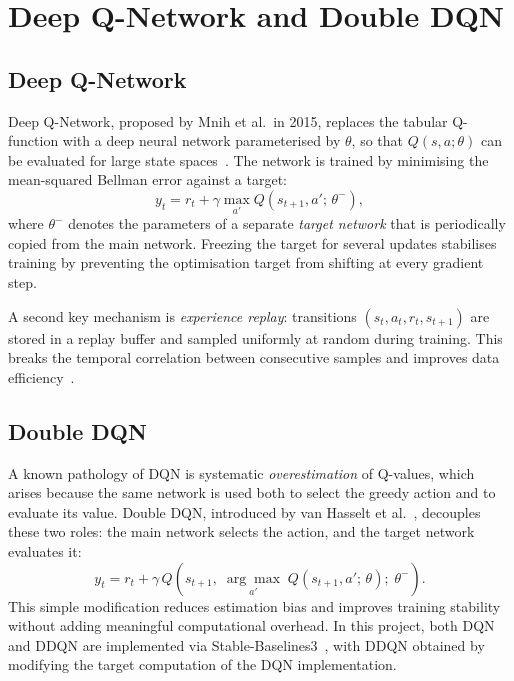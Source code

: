 \section{Deep Q-Network and Double DQN}

\subsection{Deep Q-Network}

Deep Q-Network, proposed by Mnih et al.\ in 2015, replaces the tabular
Q-function with a deep neural network parameterised by $\theta$, so that
$Q(s,a;\theta)$ can be evaluated for large state spaces~\cite{mnih2015humanlevel}.
The network is trained by minimising the mean-squared Bellman error against a
target:
\[
  y_t = r_t + \gamma\max_{a'} Q(s_{t+1}, a';\, \theta^{-}),
\]
where $\theta^{-}$ denotes the parameters of a separate \textit{target network}
that is periodically copied from the main network. Freezing the target for several
updates stabilises training by preventing the optimisation target from shifting at
every gradient step.

A second key mechanism is \textit{experience replay}: transitions
$(s_t, a_t, r_t, s_{t+1})$ are stored in a replay buffer and sampled uniformly at
random during training. This breaks the temporal correlation between consecutive
samples and improves data efficiency~\cite{mnih2015humanlevel}.

\subsection{Double DQN}

A known pathology of DQN is systematic \textit{overestimation} of Q-values, which
arises because the same network is used both to select the greedy action and to
evaluate its value. Double DQN, introduced by van Hasselt et
al.~\cite{hasselt2016ddqn}, decouples these two roles: the main network selects the
action, and the target network evaluates it:
\[
  y_t = r_t + \gamma\, Q\!\left(s_{t+1},\;
        \underset{a'}{\arg\max}\; Q(s_{t+1}, a';\,\theta);\;
        \theta^{-}\right).
\]
This simple modification reduces estimation bias and improves training stability
without adding meaningful computational overhead. In this project, both DQN and
DDQN are implemented via Stable-Baselines3~\cite{raffin2021sb3}, with DDQN
obtained by modifying the target computation of the DQN implementation.

